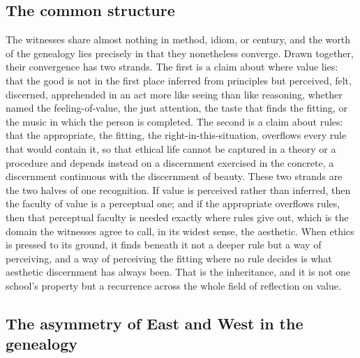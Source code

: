 \subsection{The common structure}
\label{p22:sub:gen-common}

The witnesses share almost nothing in method, idiom, or century, and the worth of the genealogy lies precisely in that they nonetheless converge. Drawn together, their convergence has two strands. The first is a claim about where value lies: that the good is not in the first place inferred from principles but perceived, felt, discerned, apprehended in an act more like seeing than like reasoning, whether named the feeling-of-value, the just attention, the taste that finds the fitting, or the music in which the person is completed. The second is a claim about rules: that the appropriate, the fitting, the right-in-this-situation, overflows every rule that would contain it, so that ethical life cannot be captured in a theory or a procedure and depends instead on a discernment exercised in the concrete, a discernment continuous with the discernment of beauty. These two strands are the two halves of one recognition. If value is perceived rather than inferred, then the faculty of value is a perceptual one; and if the appropriate overflows rules, then that perceptual faculty is needed exactly where rules give out, which is the domain the witnesses agree to call, in its widest sense, the aesthetic. When ethics is pressed to its ground, it finds beneath it not a deeper rule but a way of perceiving, and a way of perceiving the fitting where no rule decides is what aesthetic discernment has always been. That is the inheritance, and it is not one school's property but a recurrence across the whole field of reflection on value.

\subsection{The asymmetry of East and West in the genealogy}
\label{p22:sub:gen-asymmetry}

